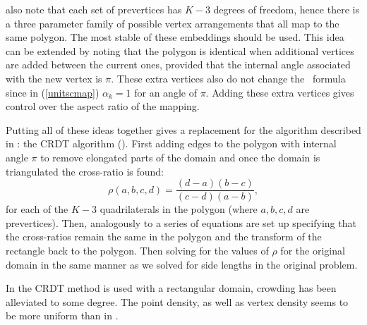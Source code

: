  also note that each set of prevertices has $K-3$ degrees of freedom, hence there is a three parameter family of possible vertex arrangements that all map to the same polygon. The most stable of these embeddings should be used. This idea can be extended by noting that the polygon is identical when additional vertices are added between the current ones, provided that the internal angle associated with the new vertex is $\pi$. These extra vertices also do not change the \sch\ formula since in (\ref{unitscmap}) $\alpha_k=1$ for an angle of $\pi$. Adding these extra vertices gives control over the aspect ratio of the mapping.

Putting all of these ideas together gives a replacement for the algorithm described in : the CRDT algorithm (\cite[pp. 30-39]{driscoll}). First adding edges to the polygon with internal angle $\pi$ to remove elongated parts of the domain and once the domain is triangulated the cross-ratio is found:
\begin{equation}
\rho(a,b,c,d) = \frac{(d-a)(b-c)}{(c-d)(a-b)},
\end{equation}
for each of the $K-3$ quadrilaterals in the polygon (where $a,b,c,d$ are prevertices). Then, analogously to  a series of equations are set up specifying that the cross-ratios remain the same in the polygon and the transform of the rectangle back to the polygon. Then solving for the values of $\rho$ for the original domain in the same manner as we solved for side lengths in the original problem. 

In  the CRDT method is used with a rectangular domain, crowding has been alleviated to some degree. The point density, as well as vertex density seems to be more uniform than in .

